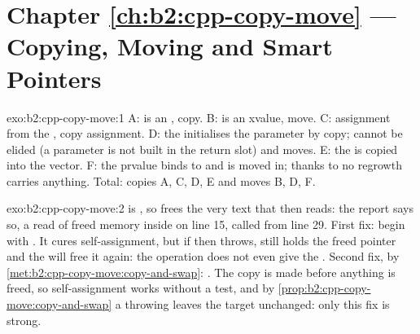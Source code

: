 \section*{Chapter \ref{ch:b2:cpp-copy-move} --- Copying, Moving and Smart Pointers}

\begin{solution}{exo:b2:cpp-copy-move:1}
A:  is an , copy. B:  is an xvalue, move. C: assignment from the  ,
copy assignment. D: the   initialises the parameter  by copy;  cannot be elided
(a parameter is not built in the return slot) and moves. E: the   is copied into the vector. F: the
prvalue  binds to  and is moved in; thanks to  no regrowth
carries anything. Total: copies A, C, D, E and moves B, D, F.
\end{solution}

\begin{solution}{exo:b2:cpp-copy-move:2}
 is , so  frees the very text that  then reads: the
report says so, a read of freed memory inside  on line 15, called from line 29. First fix:
begin with . It cures self-assignment, but if  then throws, 
still holds the freed pointer and the  will free it again: the operation does not even give the . Second fix, by \cref{met:b2:cpp-copy-move:copy-and-swap}: . The copy is made before anything is freed, so self-assignment works without a test, and by
\cref{prop:b2:cpp-copy-move:copy-and-swap} a throwing  leaves the target unchanged: only this fix is
strong.
\end{solution}

